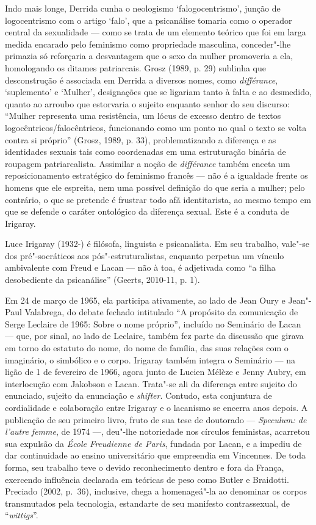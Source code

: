 Indo mais longe, Derrida cunha o neologismo `falogocentrismo', junção de
logocentrismo com o artigo `falo', que a psicanálise tomaria como o
operador central da sexualidade --- como se trata de um elemento teórico
que foi em larga medida encarado pelo feminismo como propriedade
masculina, conceder"-lhe primazia só reforçaria a desvantagem que o sexo
da mulher promoveria a ela, homologando os ditames patriarcais. Grosz
(1989, p. 29) sublinha que desconstrução é associada em Derrida a
diversos nomes, como \emph{différance}, `suplemento' e `Mulher',
designações que se ligariam tanto à falta e ao desmedido, quanto ao
arroubo que estorvaria o sujeito enquanto senhor do seu discurso:
``Mulher representa uma resistência, um lócus de excesso dentro de
textos logocêntricos/falocêntricos, funcionando como um ponto no qual o
texto se volta contra si próprio'' (Grosz, 1989, p. 33), problematizando
a diferença e as identidades sexuais tais como coordenadas em uma
estruturação binária de roupagem patriarcalista. Assimilar a noção de
\emph{différance} também enceta um reposicionamento estratégico do
feminismo francês --- não é a igualdade frente os homens que ele
espreita, nem uma possível definição do que seria a mulher; pelo
contrário, o que se pretende é frustrar todo afã identitarista, ao mesmo
tempo em que se defende o caráter ontológico da diferença sexual. Este é
a conduta de Irigaray.

Luce Irigaray (1932-) é filósofa, linguista e psicanalista. Em seu
trabalho, vale"-se dos pré"-socráticos aos pós"-estruturalistas, enquanto
perpetua um vínculo ambivalente com Freud e Lacan --- não à toa, é
adjetivada como ``a filha desobediente da psicanálise'' (Geerts,
2010-11, p. 1).

Em 24 de março de 1965, ela participa ativamente, ao lado de Jean Oury e
Jean"-Paul Valabrega, do debate fechado intitulado ``A propósito da
comunicação de Serge Leclaire de 1965: Sobre o nome próprio'', incluído
no Seminário  de Lacan --- que, por sinal, ao lado de Leclaire, também
fez parte da discussão que girava em torno do estatuto do nome, do nome
de família, das suas relações com o imaginário, o simbólico e o corpo.
Irigaray também integra o Seminário  --- na lição de 1 de fevereiro de
1966, agora junto de Lucien Mélèze e Jenny Aubry, em interlocução com
Jakobson e Lacan. Trata"-se ali da diferença entre sujeito do enunciado,
sujeito da enunciação e \emph{shifter}. Contudo, esta conjuntura de
cordialidade e colaboração entre Irigaray e o lacanismo se encerra anos
depois. A publicação de seu primeiro livro, fruto de sua tese de
doutorado --- \emph{Speculum: de l'autre femme}, de 1974 ---, deu"-lhe
notoriedade nos círculos feministas, acarretou sua expulsão da
\emph{École Freudienne de Paris}, fundada por Lacan, e a impediu de dar
continuidade ao ensino universitário que empreendia em Vincennes. De
toda forma, seu trabalho teve o devido reconhecimento dentro e fora da
França, exercendo influência declarada em teóricas de peso como Butler e
Braidotti. Preciado (2002, p.~36), inclusive, chega a homenageá"-la ao
denominar os corpos transmutados pela tecnologia, estandarte de seu
manifesto contrassexual, de ``\emph{wittigs}''.

